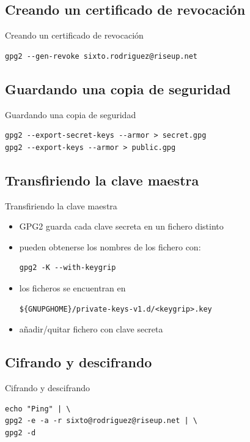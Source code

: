 \documentclass{beamer}
\begin{document}
\subsection{Creando un certificado de revocación}
\begin{frame}[fragile]{Creando un certificado de revocación}
\begin{lstlisting}
gpg2 --gen-revoke sixto.rodriguez@riseup.net
\end{lstlisting}
\end{frame}


\subsection{Guardando una copia de seguridad}
\begin{frame}[fragile]{Guardando una copia de seguridad}
\begin{lstlisting}
gpg2 --export-secret-keys --armor > secret.gpg
gpg2 --export-keys --armor > public.gpg
\end{lstlisting}
\end{frame}


\subsection{Transfiriendo la clave maestra}
\begin{frame}[fragile]{Transfiriendo la clave maestra}
\begin{itemize}
    \item GPG2 guarda cada clave secreta en un fichero distinto
    \item pueden obtenerse los nombres de los fichero con:
        \begin{lstlisting}
gpg2 -K --with-keygrip
        \end{lstlisting}
    \item los ficheros se encuentran en
        \begin{lstlisting}
${GNUPGHOME}/private-keys-v1.d/<keygrip>.key
        \end{lstlisting}
    \item añadir/quitar fichero con clave secreta
\end{itemize}
\end{frame}


\subsection{Cifrando y descifrando}
\begin{frame}[fragile]{Cifrando y descifrando}
\begin{lstlisting}
echo "Ping" | \
gpg2 -e -a -r sixto@rodriguez@riseup.net | \
gpg2 -d
\end{lstlisting}
\end{frame}
\end{document}
